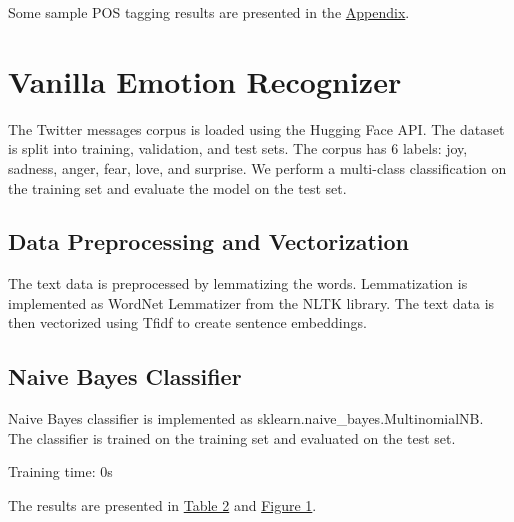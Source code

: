\documentclass{article}
\begin{document}
Some sample POS tagging results are presented in the \hyperref[appendix]{Appendix}.


\section{Vanilla Emotion Recognizer}

The Twitter messages corpus is loaded using the Hugging Face API. The dataset is split into training, validation, and test sets. The corpus has 6 labels: joy, sadness, anger, fear, love, and surprise. We perform a multi-class classification on the training set and evaluate the model on the test set.

\subsection{Data Preprocessing and Vectorization}
The text data is preprocessed by lemmatizing the words. Lemmatization is implemented as WordNet Lemmatizer from the NLTK library. The text data is then vectorized using Tfidf to create sentence embeddings.

\subsection{Naive Bayes Classifier}
Naive Bayes classifier is implemented as sklearn.naive\_bayes.MultinomialNB. The classifier is trained on the training set and evaluated on the test set.

Training time: 0s

The results are presented in \hyperref[table:nb_results_1]{Table 2} and \hyperref[fig:nb_confusion_matrix_1]{Figure 1}.
\end{document}
